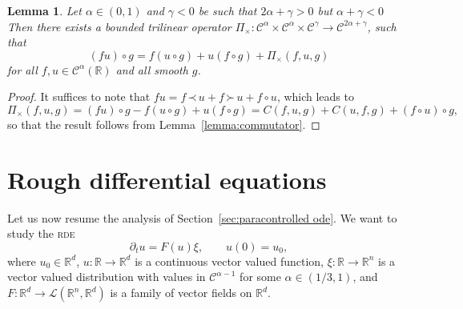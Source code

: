 \documentclass[a4paper,11pt]{article}
\newtheorem{lemma}[theorem]{Lemma}
\theoremstyle{remark}
\newcommand{\R}{\mathbb{R}}
\newcommand{\Lcal}{\mathcal{L}}
\newcommand{\CC}{\ensuremath{\mathscr{C}}}
\newcommand{\lpara}{\,\mathord{\prec}\,}
\newcommand{\rpara}{\,\mathord{\succ}\,}
\newcommand{\reso}{\,\mathord{\circ}\,}
\begin{document}
\begin{lemma}\label{lem:para-taylor product}
  Let $\alpha \in ( 0,1 )$ and $\gamma <0$ be such that $2 \alpha + \gamma >0$ but $\alpha+\gamma<0$
  Then there exists a bounded trilinear operator
  $\Pi_{\times} \colon \CC^{\alpha} \times \CC^{\alpha} \times \CC^{\gamma} \rightarrow \CC^{2 \alpha + \gamma}$, such that
  \[
     ( f u ) \reso g=f (u \reso g ) +u ( f \reso g ) + \Pi_{\times} ( f,u,g )
  \]
  for all $f,u \in \CC^{\alpha} ( \mathbb{R} )$ and all smooth $g$.
\end{lemma}

\begin{proof}
  It suffices to note that $f u = f\lpara u + f \rpara u + f \reso u$, which leads to
  \[
     \Pi_{\times} ( f,u,g ) = ( f u ) \reso g - f (u \reso g ) +u ( f \reso g ) = C(f,u,g) + C(u,f,g) + (f\reso u)\reso g,
  \]
  so that the result follows from Lemma~\ref{lemma:commutator}.
\end{proof}



\section{Rough differential equations}\label{sec:ODE}

Let us now resume the analysis of Section~\ref{sec:paracontrolled ode}. We want to study the \textsc{rde}
\begin{equation}\label{eq:rde} 
  \partial_{t} u=F ( u ) \xi, \qquad u(0) = u_0,
\end{equation}
where $u_0 \in \R^d$, $u\colon \mathbb{R} \rightarrow \mathbb{R}^{d}$ is a continuous vector
valued function, $\xi\colon \mathbb{R} \rightarrow \mathbb{R}^{n}$ is a vector valued distribution with values in
$\CC^{\alpha -1}$ for some $\alpha \in ( 1/3,1 )$, and
$F\colon \mathbb{R}^{d} \rightarrow \Lcal ( \mathbb{R}^{n} ,\mathbb{R}^{d})$ is a family of vector fields on $\mathbb{R}^{d}$.
\end{document}
